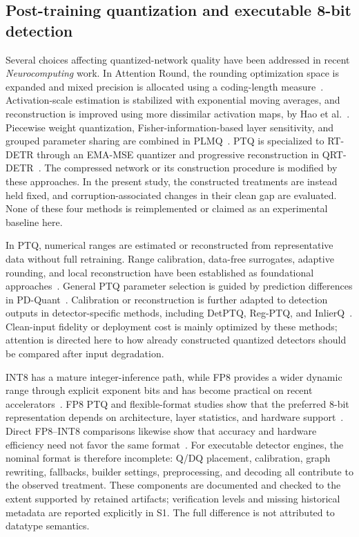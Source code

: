 \documentclass[a4paper,fleqn]{cas-dc}
\begin{document}
\subsection{Post-training quantization and executable 8-bit detection}

Several choices affecting quantized-network quality have been addressed in recent \emph{Neurocomputing} work. In Attention Round, the rounding optimization space is expanded and mixed precision is allocated using a coding-length measure~\citep{diao2024attentionround}. Activation-scale estimation is stabilized with exponential moving averages, and reconstruction is improved using more dissimilar activation maps, by Hao et al.~\citep{hao2024stabilized}. Piecewise weight quantization, Fisher-information-based layer sensitivity, and grouped parameter sharing are combined in PLMQ~\citep{feng2025plmq}. PTQ is specialized to RT-DETR through an EMA-MSE quantizer and progressive reconstruction in QRT-DETR~\citep{huo2026qrt}. The compressed network or its construction procedure is modified by these approaches. In the present study, the constructed treatments are instead held fixed, and corruption-associated changes in their clean gap are evaluated. None of these four methods is reimplemented or claimed as an experimental baseline here.

In PTQ, numerical ranges are estimated or reconstructed from representative data without full retraining. Range calibration, data-free surrogates, adaptive rounding, and local reconstruction have been established as foundational approaches~\citep{krishnamoorthi2018whitepaper,nagel2019dfq,cai2020zeroq,nagel2020adaround,hubara2021smallcalibration,li2021brecq,wei2022qdrop}. General PTQ parameter selection is guided by prediction differences in PD-Quant~\citep{liu2023pdquant}. Calibration or reconstruction is further adapted to detection outputs in detector-specific methods, including DetPTQ, Reg-PTQ, and InlierQ~\citep{niu2023detptq,ding2024regptq,kim2026inlierq}. Clean-input fidelity or deployment cost is mainly optimized by these methods; attention is directed here to how already constructed quantized detectors should be compared after input degradation.

INT8 has a mature integer-inference path, while FP8 provides a wider dynamic range through explicit exponent bits and has become practical on recent accelerators~\citep{jacob2018integer,micikevicius2022fp8,noune2022eightbit,kuzmin2022fp8}. FP8 PTQ and flexible-format studies show that the preferred 8-bit representation depends on architecture, layer statistics, and hardware support~\citep{shen2024fp8,zhang2023flexible8bit}. Direct FP8--INT8 comparisons likewise show that accuracy and hardware efficiency need not favor the same format~\citep{vanbaalen2023fp8int8}. For executable detector engines, the nominal format is therefore incomplete: Q/DQ placement, calibration, graph rewriting, fallbacks, builder settings, preprocessing, and decoding all contribute to the observed treatment. These components are documented and checked to the extent supported by retained artifacts; verification levels and missing historical metadata are reported explicitly in S1. The full difference is not attributed to datatype semantics.
\end{document}
